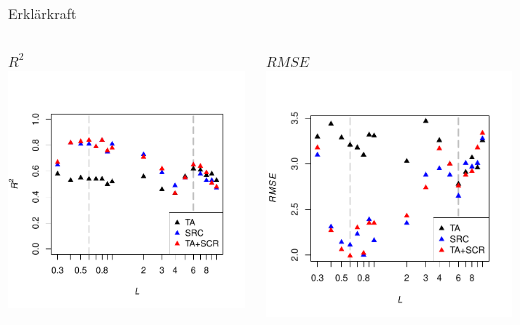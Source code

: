 \begin{frame}{Erklärkraft}
\begin{columns}
\column{5.5cm}
\begin{block}{$R^2$}
\centering\includegraphics[width=1\textwidth]{FIGURE/Figure_R2.pdf}
\end{block}
\column{5.5cm}
\begin{block}{$RMSE$}
\centering\includegraphics[width=1\textwidth]{FIGURE/Figure_RMSE.pdf}
\end{block}
\end{columns}
\end{frame}

